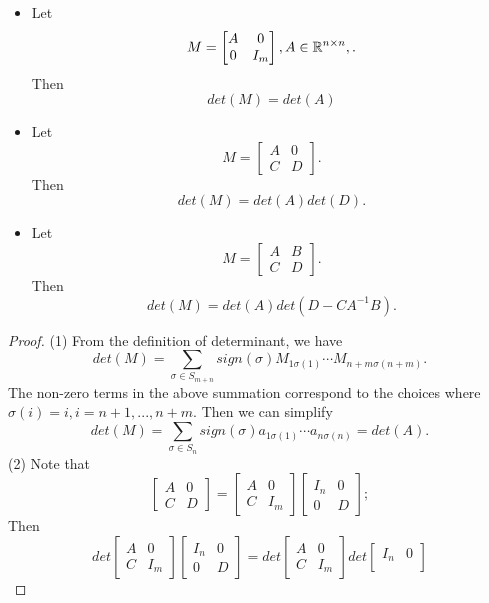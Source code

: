 \begin{refsection}
\begin{lemma}\hfill
	\begin{itemize}
		\item Let $$M = \begin{bmatrix}
		A& 0\\
		0& I_m
		\end{bmatrix}, A\in\R^{n\times n}, .$$
		Then
		$$det(M) = det(A)$$
		\item Let $$M = \begin{bmatrix}
		A& 0\\
		C& D
		\end{bmatrix}.$$
		Then
		$$det(M) = det(A)det(D). $$
		\item Let $$M = \begin{bmatrix}
		A& B\\
		C& D
		\end{bmatrix}.$$
		Then
		$$det(M) = det(A)det(D - CA^{-1}B). $$
	\end{itemize}	
\end{lemma}
\begin{proof}
(1)	From the definition of determinant, we have
$$det(M) = \sum_{\sigma \in S_{m+n}} sign(\sigma)M_{1\sigma(1)}\cdots M_{n+m\sigma(n+m)}.$$
The non-zero terms in the above summation correspond to the choices where $\sigma(i) = i,i=n+1,...,n+m$. Then we can simplify
$$det(M) = \sum_{\sigma \in S_n} sign(\sigma)a_{1\sigma(1)}\cdots a_{n\sigma(n)} = det(A).$$
	(2) Note that
	$$\begin{bmatrix}
	A& 0\\
	C& D
	\end{bmatrix} = \begin{bmatrix}
	A& 0\\
	C& I_m
	\end{bmatrix} \begin{bmatrix}
	I_n& 0\\
	0& D
	\end{bmatrix};$$
	Then $$det \begin{bmatrix}
	A& 0\\
	C& I_m
	\end{bmatrix} \begin{bmatrix}
	I_n& 0\\
	0& D
	\end{bmatrix} = det  \begin{bmatrix}
	A& 0\\
	C& I_m
	\end{bmatrix} det \begin{bmatrix}
	I_n& 0\\

\end{bmatrix}$$
\end{proof}
\end{refsection}
